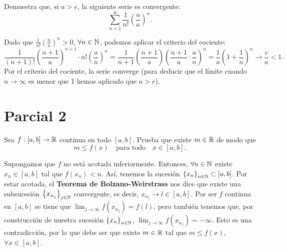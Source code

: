 \documentclass{article}
\begin{document}
\begin{ej}
Demuestra que, si $\displaystyle a > e $, la siguiente serie es convergente:
\[\sum^{\infty}_{n = 1}\frac{1}{n!}\left(\frac{n}{a}\right)^{n} .\]
\end{ej}
\begin{sol}
Dado que $\displaystyle \frac{1}{n!}\left(\frac{n}{a}\right)^{n} > 0 $, $\displaystyle \forall n \in \mathbb{N} $, podemos aplicar el criterio del cociente:
\[\frac{1}{\left(n+1\right)!}\left(\frac{n+1}{a}\right)^{n+1} \cdot n!\left(\frac{a}{n}\right)^{n} = \frac{1}{n+1}\left(\frac{n+1}{a}\right)\left(\frac{n+1}{a} \cdot \frac{a}{n}\right)^{n} = \frac{1}{a}\left(1+\frac{1}{n}\right)^{n} \to \frac{e}{a} < 1.\]
Por el criterio del cociente, la serie converge (para deducir que el límite cuando $\displaystyle n \to \infty $ es menor que 1 hemos aplicado que $\displaystyle a > e $).
\end{sol}
\section{Parcial 2}
\begin{ej}
	Sea $\displaystyle f: \left[a,b\right] \to \mathbb{R} $ continua en todo $\displaystyle \left[a,b\right]  $. Prueba que existe $\displaystyle m \in \mathbb{R} $ de modo que 
	\[ m \leq f\left(x\right) \quad \text{para todo} \quad x \in \left[a,b\right]  .\]
\end{ej}
\begin{sol}
	Supongamos que $\displaystyle f $ no está acotada inferiormente. Entonces, $\displaystyle \forall n \in \mathbb{N} $ existe $\displaystyle x_{n} \in \left[a,b\right]  $ tal que $\displaystyle f\left(x_{n}\right) < n $. Así, tenemos la sucesión $\displaystyle \left\{ x_{n}\right\} _{n\in\mathbb{N}} \subset \left[a,b\right]  $. Por estar acotada, el \textbf{Teorema de Bolzano-Weirstrass} nos dice que existe una subsucesión $\displaystyle \left\{ x_{n_{j}}\right\} _{j\in\mathbb{N}} $ convergente, es decir, $\displaystyle x_{n_{j}} \to l \in \left[a,b\right]  $. 
	Por ser $\displaystyle f $ continua en $\displaystyle \left[a,b\right]  $ se tiene que $\displaystyle \lim_{j \to \infty}f\left(x_{n_{j}}\right) = f\left(l\right) $, pero también tenemos que, por construcción de nuestra sucesión $\displaystyle \left\{ x_{n}\right\} _{n\in\mathbb{N}} $, $\displaystyle \lim_{j \to \infty}f\left(x_{n_{j}}\right) = -\infty $. Esto es una contradicción, por lo que debe ser que existe $\displaystyle m \in \mathbb{R} $ tal que $\displaystyle m \leq f\left(x\right) $, $\displaystyle \forall x \in \left[a,b\right]  $.
\end{sol}
\end{document}
